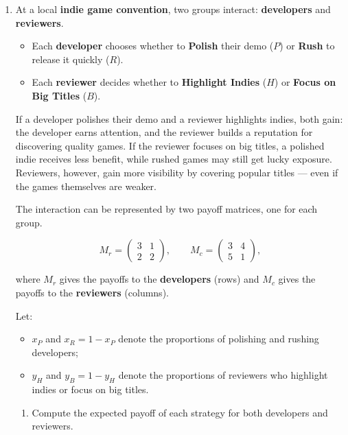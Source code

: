 \documentclass[12pt,a4paper,twoside]{article}
\begin{document}
\begin{enumerate}
\begin{enumerate}
\begin{enumerate}
        \end{enumerate}
    \end{enumerate}

\newpage
\item

At a local \textbf{indie game convention}, two groups interact: \textbf{developers}
and \textbf{reviewers}.  

\begin{itemize}
  \item Each \textbf{developer} chooses whether to \textbf{Polish} their demo
  (\(P\)) or \textbf{Rush} to release it quickly (\(R\)).
  \item Each \textbf{reviewer} decides whether to \textbf{Highlight Indies}
  (\(H\)) or \textbf{Focus on Big Titles} (\(B\)).
\end{itemize}

If a developer polishes their demo and a reviewer highlights indies, both gain:
the developer earns attention, and the reviewer builds a reputation for
discovering quality games. If the reviewer focuses on big titles, a polished
indie receives less benefit, while rushed games may still get lucky exposure.
Reviewers, however, gain more visibility by covering popular titles — even if
the games themselves are weaker.

The interaction can be represented by two payoff matrices, one for each group.

\[
M_r =
\begin{pmatrix}
3 & 1 \\
2 & 2
\end{pmatrix},
\qquad
M_c =
\begin{pmatrix}
3 & 4 \\
5 & 1
\end{pmatrix},
\]

where \(M_r\) gives the payoffs to the \textbf{developers} (rows) and \(M_c\)
gives the payoffs to the \textbf{reviewers} (columns).

Let:
\begin{itemize}
  \item \(x_P\) and \(x_R = 1 - x_P\) denote the proportions of polishing and
  rushing developers;
  \item \(y_H\) and \(y_B = 1 - y_H\) denote the proportions of reviewers who
  highlight indies or focus on big titles.
\end{itemize}

\begin{enumerate}
    \item Compute the expected payoff of each strategy for both developers and
reviewers.


\end{enumerate}
\end{enumerate}
\end{document}
